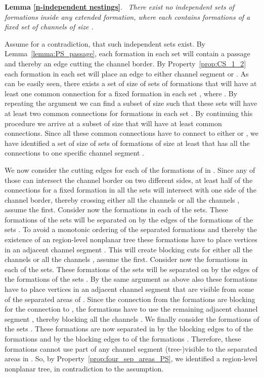 \documentclass[a4paper,10pt]{llncs}
\newcounter{prop}
\renewenvironment{proof}
{{\bf Proof:}}{\hspace*{\fill}\par\vspace{2mm}}
\newcommand{\rephrase}[3]{\noindent\textbf{#1 #2}.~\emph{#3}}
\begin{document}
\rephrase{Lemma}{\ref{n-independent nestings}}{
There exist no  independent sets of formations  inside any extended formation,
where each  contains formations of a fixed set of channels of size .
}

\begin{proof}
Assume for a contradiction, that such independent sets  exist.
By Lemma~\ref{lemma:PS_passage}, each formation in each set will contain a passage and thereby an edge cutting the channel border.
By Property~\ref{prop:CS_1_2} each formation in each set will place an edge to either channel segment  or . As can be easily seen, there exists a set  of size  of sets of formations that will have at least one common connection for a fixed formation  in each set , where .
By repeating the argument we can find a subset  of size  such that these sets will have at least two common connections for formations  in each set . By continuing this procedure we arrive at a subset  of size  that will have at least  common connections. Since all these common connections have to connect to either  or , we have identified a set  of size  of sets of formations of size at least  that has all the connections to one specific channel segment .

We now consider the cutting edges for each of the formations of  in . Since any of those can intersect the channel border on two different sides, at least half of the connections for a fixed formation  in all the sets will intersect with one side of the channel border, thereby crossing either all the channels  or all the channels , assume the first. Consider now the formations  in each of the sets.
These formations of the sets  will be separated on  by the edges of the formations  of the sets . To avoid a monotonic ordering of the separated formations and thereby the existence of an region-level nonplanar tree these formations  have to place vertices in an adjacent channel segment . This will create blocking cuts for either all the channels  or all the channels , assume the first.
Consider now the formations  in each of the sets. These formations of the sets  will be separated on  by the edges of the formations  of the sets .
By the same argument as above also these formations have to place vertices in an adjacent channel segment that are visible from some of the separated areas of . Since the connection from the formations  are blocking for the connection to , the formations  have to use the remaining adjacent channel segment , thereby blocking all the channels . We finally consider the formations   of the sets . These formations are now separated in  by the blocking edges to  of the formations  and by the blocking edges to  of the formations . Therefore, these formations cannot use part of any channel segment (tree-)visible to the separated areas in . So, by Property~\ref{prop:four_sep_areas_PS}, we identified a region-level nonplanar tree, in contradiction to the assumption.
\end{proof}
\end{document}
